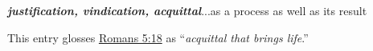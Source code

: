 		
			\subparagraph{\texorpdfstring{}{}}
				\label{DIKAIOSIS}
			
				\begin{compactdesc}
					\item[BDAG 221b] \textbf{}
						\begin{compactitem}
							\item \textbf{\textit{justification, vindication, acquittal}}...as a process as well as its result
								\begin{compactitem}
									\item This entry glosses \hyperref[ROMANS-5-18]{Romans 5:18} as ``\textit{acquittal that brings life}.''
								\end{compactitem}
						\end{compactitem}
				\end{compactdesc}
				
				
				
		
	
